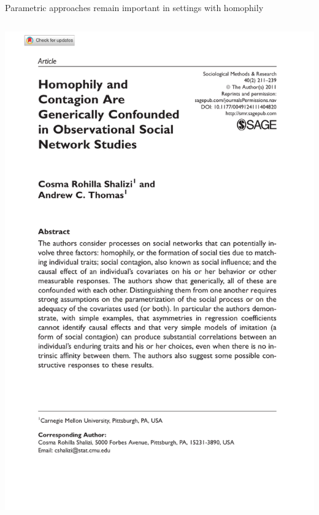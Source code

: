 \documentclass[aspectratio=169]{beamer}
\theoremstyle{remark}
\begin{document}
\begin{frame}{Parametric approaches remain important in settings with homophily}
\begin{columns}
\begin{column}{0.49\paperwidth}
{                \includegraphics[height=\textheight, page=1, trim={1.5cm 4.5cm 0cm 2.2cm}, clip]{./papers/thomas.pdf}
            }
        \end{column}
    \end{columns}
\end{frame}
\end{document}
